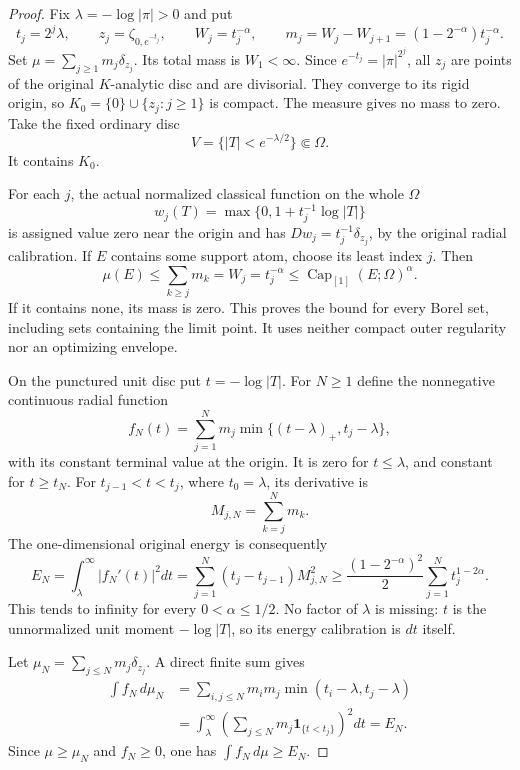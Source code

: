 \documentclass[11pt,a4paper]{article}
\numberwithin{equation}{section}
\theoremstyle{definition}
\theoremstyle{remark}
\begin{document}
\begin{proof}
Fix $\lambda=-\log|\pi|>0$ and put
\[
 t_j=2^j\lambda,\qquad z_j=\zeta_{0,e^{-t_j}},\qquad
 W_j=t_j^{-\alpha},\qquad
 m_j=W_j-W_{j+1}=(1-2^{-\alpha})t_j^{-\alpha}.
\]
Set $\mu=\sum_{j\ge1}m_j\delta_{z_j}$. Its total mass is
$W_1<\infty$. Since $e^{-t_j}=|\pi|^{2^j}$, all $z_j$ are points
of the original $K$-analytic disc and are divisorial. They converge
to its rigid origin, so
$K_0=\{0\}\cup\{z_j:j\ge1\}$ is compact. The measure gives no
mass to zero. Take the fixed ordinary disc
\[
                         V=\{|T|<e^{-\lambda/2}\}\Subset\Omega.
\]
It contains $K_0$.

For each $j$, the actual normalized classical function on the whole
$\Omega$
\[
             w_j(T)=\max\{0,1+t_j^{-1}\log|T|\}
\]
is assigned value zero near the origin and has
$D w_j=t_j^{-1}\delta_{z_j}$, by the original radial calibration.
If $E$ contains some support atom, choose its least index $j$.
Then
\[
       \mu(E)\le\sum_{k\ge j}m_k=W_j=t_j^{-\alpha}
                       \le\operatorname{Cap}_{[1]}(E;\Omega)^\alpha.
\]
If it contains none, its mass is zero. This proves the bound for
every Borel set, including sets containing the limit point. It uses
neither compact outer regularity nor an optimizing envelope.

On the punctured unit disc put $t=-\log|T|$. For $N\ge1$ define
the nonnegative continuous radial function
\[
 f_N(t)=\sum_{j=1}^N m_j\min\{(t-\lambda)_+,t_j-\lambda\},
\]
with its constant terminal value at the origin. It is zero for
$t\le\lambda$, and constant for $t\ge t_N$. For
$t_{j-1}<t<t_j$, where $t_0=\lambda$, its derivative is
\[
                         M_{j,N}=\sum_{k=j}^N m_k.
\]
The one-dimensional original energy is consequently
\begin{equation}
 E_N=\int_\lambda^\infty|f_N'(t)|^2dt
       =\sum_{j=1}^N(t_j-t_{j-1})M_{j,N}^2
       \ge\frac{(1-2^{-\alpha})^2}{2}
                       \sum_{j=1}^N t_j^{1-2\alpha}.
 \label{eq:r6-radial-energy-divergence}
\end{equation}
This tends to infinity for every $0<\alpha\le1/2$.
No factor of $\lambda$ is missing: $t$ is the unnormalized unit
moment $-\log|T|$, so its energy calibration is $dt$ itself.

Let $\mu_N=\sum_{j\le N}m_j\delta_{z_j}$. A direct finite sum gives
\[
 \begin{split}
 \int f_N\,d\mu_N
  &=\sum_{i,j\le N}m_im_j
                       \min(t_i-\lambda,t_j-\lambda)\\
  &=\int_\lambda^\infty
                  \left(\sum_{j\le N}m_j\mathbf1_{\{t<t_j\}}\right)^2dt
    =E_N.
 \end{split}
\]
Since $\mu\ge\mu_N$ and $f_N\ge0$, one has
$\int f_N\,d\mu\ge E_N$.


\end{proof}
\end{document}
